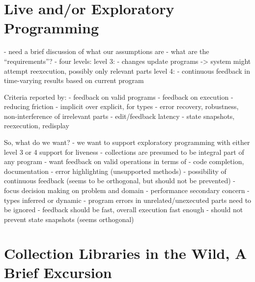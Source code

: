 \documentclass[sigconf, 10pt]{acmart}
\begin{document}
\section{Live and/or Exploratory Programming}
\begin{note}
  - need a brief discussion of what our assumptions are
  - what are the ``requirements''?
  - four levels: \citep{Tanimoto:1990:Viva}
    level 3:
     - changes update programs
       -> system might attempt reexecution, possibly only relevant parts
    level 4:
     - continuous feedback in time-varying results based on current program
  

Criteria reported by:
   \citep{McDirmid:2007:LUL,Burckhardt:2013:ACF}
  - feedback on valid programs
  - feedback on execution
  - reducing friction
   - implicit over explicit, for types
   - error recovery, robustness, non-interference of irrelevant parts
   - edit/feedback latency
  - state snapshots, reexecution, redisplay


So, what do we want?
 - we want to support exploratory programming with either level 3 or 4 support for liveness 
 - collections are presumed to be integral part of any program
 - want feedback on valid operations in terms of
   - code completion, documentation
   - error highlighting (unsupported methods)
 - possibility of continuous feedback
   (seems to be orthogonal, but should not be prevented)
 - focus decision making on problem and domain
   - performance secondary concern
   - types inferred or dynamic
   - program errors in unrelated/unexecuted parts need to be ignored
 - feedback should be fast, overall execution fast enough
 - should not prevent state snapshots (seems orthogonal)
   

\end{note}

\section{Collection Libraries in the Wild, A Brief Excursion}
\end{document}
